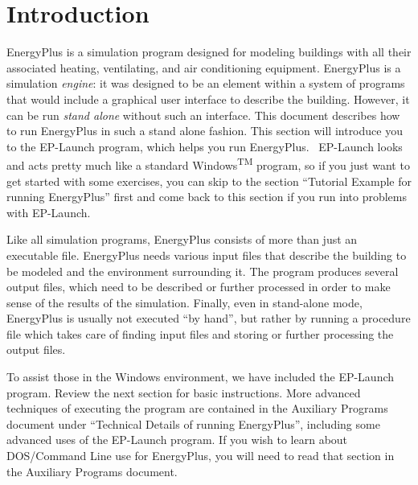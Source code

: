 \section{Introduction}\label{introduction}

EnergyPlus is a simulation program designed for modeling buildings with all their associated heating, ventilating, and air conditioning equipment. EnergyPlus is a simulation \emph{engine}: it was designed to be an element within a system of programs that would include a graphical user interface to describe the building. However, it can be run \emph{stand alone} without such an interface. This document describes how to run EnergyPlus in such a stand alone fashion. This section will introduce you to the EP-Launch program, which helps you run EnergyPlus.~ EP-Launch looks and acts pretty much like a standard Windows\textsuperscript{TM} program, so if you just want to get started with some exercises, you can skip to the section ``Tutorial Example for running EnergyPlus'' first and come back to this section if you run into problems with EP-Launch.

Like all simulation programs, EnergyPlus consists of more than just an executable file. EnergyPlus needs various input files that describe the building to be modeled and the environment surrounding it. The program produces several output files, which need to be described or further processed in order to make sense of the results of the simulation. Finally, even in stand-alone mode, EnergyPlus is usually not executed ``by hand'', but rather by running a procedure file which takes care of finding input files and storing or further processing the output files.

To assist those in the Windows environment, we have included the EP-Launch program. Review the next section for basic instructions. More advanced techniques of executing the program are contained in the Auxiliary Programs document under ``Technical Details of running EnergyPlus'', including some advanced uses of the EP-Launch program. If you wish to learn about DOS/Command Line use for EnergyPlus, you will need to read that section in the Auxiliary Programs document.
